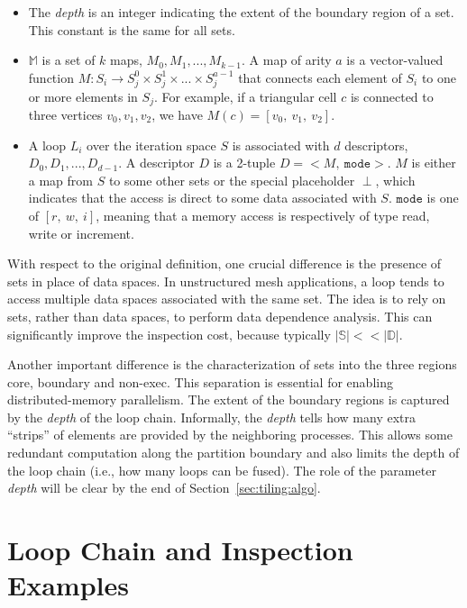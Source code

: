 \begin{itemize}
\item The {\em depth} is an integer indicating the extent of the boundary region of a set. This constant is the same for all sets. 

\item $\mathbb{M}$ is a set of $k$ maps, $M_0, M_1, ..., M_{k-1}$. A map of arity $a$ is a vector-valued function $M : S_i \rightarrow S_j^0 \times S_j^1 \times ... \times S_j^{a-1}$ that connects each element of $S_i$ to one or more elements in $S_j$. For example, if a triangular cell $c$ is connected to three vertices $v_0,v_1,v_2$, we have $M(c) = [v_0,\ v_1,\ v_2]$. 

\item A loop $L_i$ over the iteration space $S$ is associated with $d$ descriptors, $D_0, D_1, ..., D_{d-1}$. A descriptor $D$ is a 2-tuple $D = {<}M,\ \texttt{mode}{>}$. $M$ is either a map from $S$ to some other sets or the special placeholder $\perp$, which indicates that the access is direct to some data associated with $S$. $\texttt{mode}$ is one of $[r,\ w,\ i]$, meaning that a memory access is respectively of type read, write or increment.
\end{itemize}

With respect to the original definition, one crucial difference is the presence of sets in place of data spaces. In unstructured mesh applications, a loop tends to access multiple data spaces associated with the same set. The idea is to rely on sets, rather than data spaces, to perform data dependence analysis. This can significantly improve the inspection cost, because typically $|\mathbb{S}| << |\mathbb{D}|$. 

Another important difference is the characterization of sets into the three regions core, boundary and non-exec. This separation is essential for enabling distributed-memory parallelism. The extent of the boundary regions is captured by the {\em depth} of the loop chain. Informally, the {\em depth} tells how many extra ``strips'' of elements are provided by the neighboring processes. This allows some redundant computation along the partition boundary and also limits the depth of the loop chain (i.e., how many loops can be fused). The role of the parameter {\em depth} will be clear by the end of Section~\ref{sec:tiling:algo}. 


\section{Loop Chain and Inspection Examples}
\label{sec:tiling:examples}

